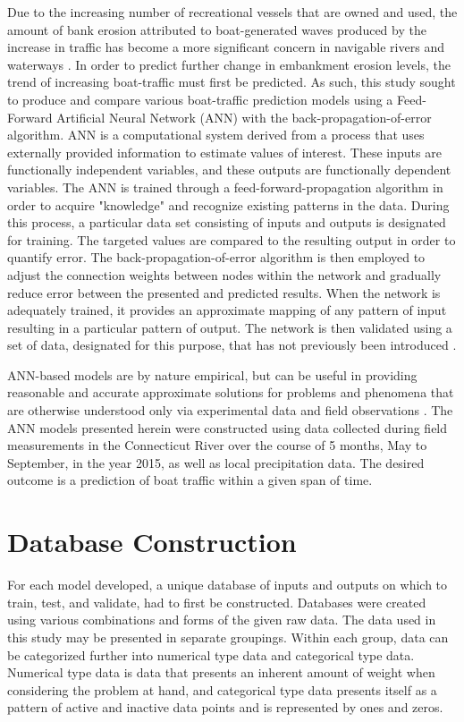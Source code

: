 \documentclass[
10pt, %
letterpaper, %
twoside, %
headinclude,footinclude, %
BCOR5mm, %
]{scrartcl}
\begin{document}
Due to the increasing number of recreational vessels that are owned and used, the amount of bank erosion attributed to boat-generated waves produced by the increase in traffic has become a more significant concern in navigable rivers and waterways \cite{simon2016boat}. In order to predict further change in embankment erosion levels, the trend of increasing boat-traffic must first be predicted. As such, this study sought to produce and compare various boat-traffic prediction models using a Feed-Forward Artificial Neural Network (ANN) with the back-propagation-of-error algorithm. ANN is a computational system derived from a process that uses externally provided information to estimate values of interest. These inputs are functionally independent variables, and these outputs are functionally dependent variables. The ANN is trained through a feed-forward-propagation algorithm in order to acquire "knowledge" and recognize existing patterns in the data. During this process, a particular data set consisting of inputs and outputs is designated for training.  The targeted values are compared to the resulting output in order to quantify error.  The back-propagation-of-error algorithm is then employed to adjust the connection weights between nodes within the network and gradually reduce error between the presented and predicted results.  When the network is adequately trained, it provides an approximate mapping of any pattern of input resulting in a particular pattern of output. The network is then validated using a set of data, designated for this purpose, that has not previously been introduced \cite{uddinhudson2013}.

ANN-based models are by nature empirical, but can be useful in providing reasonable and accurate approximate solutions for problems and phenomena that are otherwise understood only via experimental data and field observations \cite{basheer2000artificial}. The ANN models presented herein were constructed using data collected during field measurements in the Connecticut River over the course of 5 months, May to September, in the year 2015, as well as local precipitation data. The desired outcome is a prediction of boat traffic within a given span of time.


\section{Database Construction}\label{sec:DBconstruct}
For each model developed, a unique database of inputs and outputs on which to train, test, and validate, had to first be constructed. Databases were created using various combinations and forms of the given raw data. The data used in this study may be presented in separate groupings. Within each group, data can be categorized further into numerical type data and categorical type data. Numerical type data is data that presents an inherent amount of weight when considering the problem at hand, and categorical type data presents itself as a pattern of active and inactive data points and is represented by ones and zeros.
\end{document}
